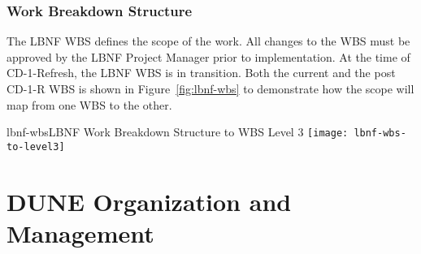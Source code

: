 \subsubsection{Work Breakdown Structure}
The LBNF WBS defines the scope of the work. All changes to the WBS must be approved by the LBNF Project Manager prior to implementation. At the time of CD-1-Refresh, the LBNF WBS is in transition. Both the current and the post CD-1-R WBS is shown in Figure~\ref{fig:lbnf-wbs} to demonstrate how the scope will map from one WBS to the other. 

\begin{cdrfigure}{lbnf-wbs}{LBNF Work Breakdown Structure to WBS Level 3}
  \texttt{[image: lbnf-wbs-to-level3]}
\end{cdrfigure}



\section{DUNE Organization and Management}

%

